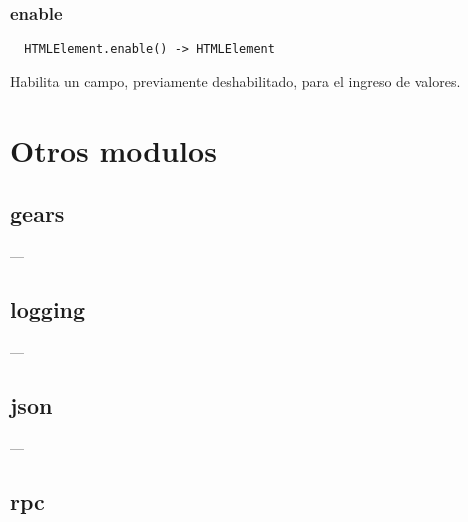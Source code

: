 \subsubsection*{enable}
\begin{verbatim}
  HTMLElement.enable() -> HTMLElement
\end{verbatim}
Habilita un campo, previamente deshabilitado, para el ingreso de valores.

\section{Otros modulos}
\subsection{gears}
---
\subsection{logging}
---
\subsection{json}
---
\subsection{rpc}